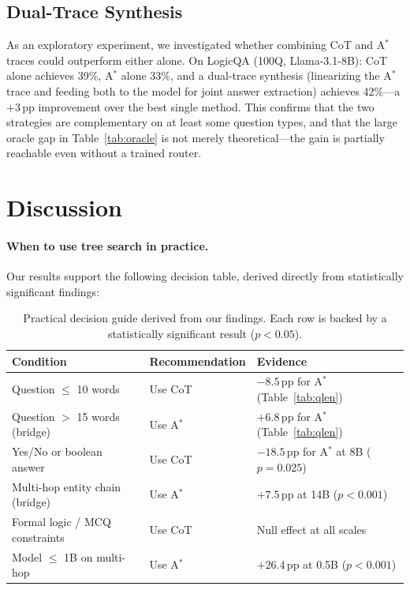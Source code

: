 \documentclass{article}
\newcommand{\astar}{A$^*$\xspace}
\begin{document}
\subsection{Dual-Trace Synthesis}
\label{sec:synthesis}

As an exploratory experiment, we investigated whether combining CoT and \astar traces could outperform either alone. On LogicQA (100Q, Llama-3.1-8B): CoT alone achieves 39\%, \astar alone 33\%, and a dual-trace synthesis (linearizing the \astar trace and feeding both to the model for joint answer extraction) achieves 42\%---a $+3$\,pp improvement over the best single method. This confirms that the two strategies are complementary on at least some question types, and that the large oracle gap in Table~\ref{tab:oracle} is not merely theoretical---the gain is partially reachable even without a trained router.

\section{Discussion}
\label{sec:discussion}

\paragraph{When to use tree search in practice.}
Our results support the following decision table, derived directly from statistically significant findings:

\begin{table}[h]
\centering
\caption{Practical decision guide derived from our findings. Each row is backed by a statistically significant result ($p<0.05$).}
\label{tab:decision}
\small
\begin{tabular}{lll}
\toprule
Condition & Recommendation & Evidence \\
\midrule
Question $\leq$ 10 words         & Use CoT    & $-8.5$\,pp for \astar (Table~\ref{tab:qlen}) \\
Question $>$ 15 words (bridge)   & Use \astar & $+6.8$\,pp for \astar (Table~\ref{tab:qlen}) \\
Yes/No or boolean answer         & Use CoT    & $-18.5$\,pp for \astar at 8B ($p=0.025$) \\
Multi-hop entity chain (bridge)  & Use \astar & $+7.5$\,pp at 14B ($p<0.001$) \\
Formal logic / MCQ constraints   & Use CoT    & Null effect at all scales \\
Model $\leq$ 1B on multi-hop     & Use \astar & $+26.4$\,pp at 0.5B ($p<0.001$) \\
\bottomrule
\end{tabular}
\end{table}
\end{document}
